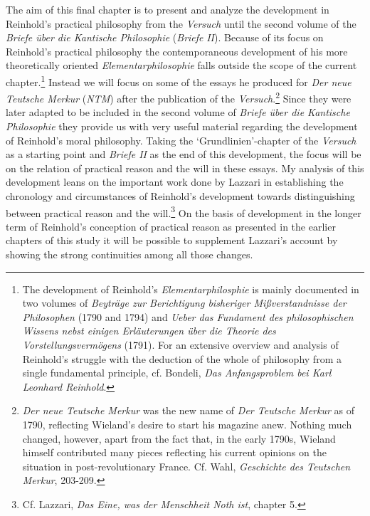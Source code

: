 The aim of this final chapter is to present and analyze the development in Reinhold's practical philosophy from the \textit{Versuch} until the second volume of the \textit{Briefe \"{u}ber die Kantische Philosophie} (\textit{Briefe} \textit{II}). Because of its focus on Reinhold's practical philosophy the contemporaneous development of his more theoretically oriented \textit{Elementarphilosophie} falls outside the scope of the current chapter.\footnote{ The development of Reinhold's \textit{Elementarphilosphie }is mainly documented in two volumes of \textit{Beytr\"{a}ge zur Berichtigung bisheriger Mi\ss{}verstandnisse der Philosophen} (1790 and 1794) and \textit{Ueber das Fundament des philosophischen Wissens nebst einigen Erl\"{a}uterungen \"{u}ber die Theorie des Vorstellungsverm\"{o}gens }(1791). For an extensive overview and analysis of Reinhold's struggle with the deduction of the whole of philosophy from a single fundamental principle, cf. Bondeli, \textit{Das Anfangsproblem bei Karl Leonhard Reinhold}. } Instead we will focus on some of the essays he produced for \textit{Der neue Teutsche Merkur }(\textit{NTM}) after the publication of the \textit{Versuch}.\footnote{ \textit{Der neue Teutsche Merkur} was the new name of \textit{Der Teutsche Merkur} as of 1790, reflecting Wieland's desire to start his magazine anew. Nothing much changed, however, apart from the fact that, in the early 1790s, Wieland himself contributed many pieces reflecting his current opinions on the situation in post{-}revolutionary France. Cf. Wahl, \textit{Geschichte des Teutschen Merkur}, 203{-}209.} Since they were later adapted to be included in the second volume of \textit{Briefe \"{u}ber die Kantische Philosophie} they provide us with very useful material regarding the development of Reinhold's moral philosophy. Taking the `Grundlinien'{-}chapter of the \textit{Versuch} as a starting point and \textit{Briefe II} as the end of this development, the focus will be on the relation of practical reason and the will in these essays. My analysis of this development leans on the important work done by Lazzari in establishing the chronology and circumstances of Reinhold's development towards distinguishing between practical reason and the will.\footnote{ Cf. Lazzari, \textit{Das Eine, was der Menschheit Noth ist}, chapter 5. } On the basis of development in the longer term of Reinhold's conception of practical reason as presented in the earlier chapters of this study it will be possible to supplement Lazzari's account by showing the strong continuities among all those changes. 

